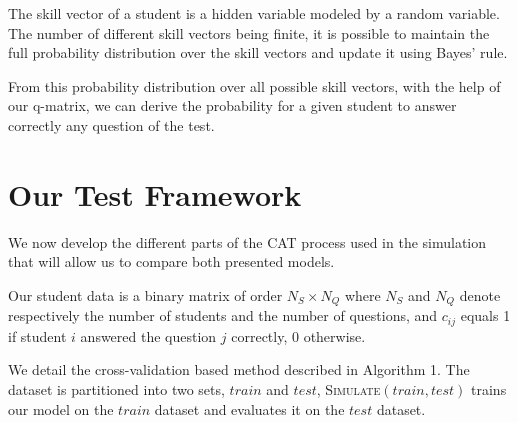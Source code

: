 \documentclass{sig-alternate}
\begin{document}
The skill vector of a student is a hidden variable modeled by a random variable. The number of different skill vectors being finite, it is possible to maintain the full probability distribution over the skill vectors and update it using Bayes' rule.

From this probability distribution over all possible skill vectors, with the help of our q-matrix, we can derive the probability for a given student to answer correctly any question of the test.



\section{Our Test Framework}

We now develop the different parts of the CAT process used in the simulation that will allow us to compare both presented models.

Our student data is a binary matrix of order $N_S \times N_Q$ where $N_S$ and $N_Q$ denote respectively the number of students and the number of questions, and $c_{ij}$ equals 1 if student $i$ answered the question $j$ correctly, 0 otherwise. 

We detail the cross-validation based method described in Algorithm 1. The dataset is partitioned into two sets, $train$ and $test$, \textsc{Simulate}$(train, test)$ trains our model on the $train$ dataset and evaluates it on the $test$ dataset.
\end{document}
